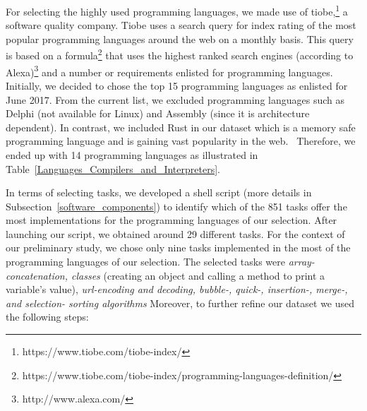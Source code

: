 For selecting the highly used programming languages, we made use 
of tiobe,\footnote{https://www.tiobe.com/tiobe-index/} a software 
quality company.
Tiobe uses a search query for index rating of the most popular programming languages around the web on a monthly basis. This query is based on a formula\footnote{https://www.tiobe.com/tiobe-index/programming-languages-definition/} that uses the highest ranked search engines (according to Alexa)\footnote{http://www.alexa.com/} and a number or requirements enlisted for programming languages.
Initially, we decided to chose the top 15 programming languages 
as enlisted for June 2017. 
From the current list, we excluded programming languages such as 
Delphi (not available for Linux) and Assembly (since it is architecture dependent). 
In contrast, we included Rust in our dataset which is a memory safe 
programming language and is gaining vast popularity in the web. \
Therefore, we ended up with 14 programming languages as illustrated 
in Table~\ref{Languages_Compilers_and_Interpreters}.

In terms of selecting tasks, we developed a shell script (more 
details in Subsection~\ref{software_components}) to identify 
which of the 851 tasks offer the most implementations for the 
programming languages of our selection.
After launching our script, we obtained around 29 different tasks. 
For the context of our preliminary study, we chose only 
nine tasks implemented in the most of the programming languages 
of our selection. 
The selected tasks were \textit{array-concatenation, classes} 
(creating an object and calling a method to print a variable's value), 
\textit{url-encoding and decoding, bubble-, quick-, insertion-, merge-, 
	and selection- sorting algorithms}
Moreover, to further refine our dataset we used the following steps: 

